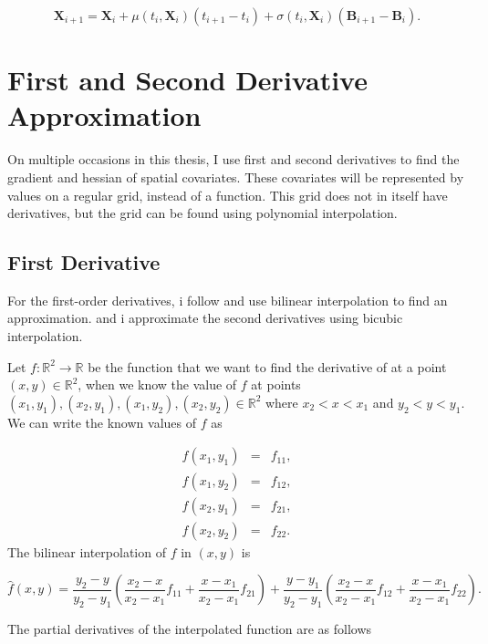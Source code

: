 \begin{equation}
    \textbf{X}_{i+1} = \textbf{X}_i + \mu(t_i, \textbf{X}_i)(t_{i+1} - t_i) + \sigma(t_i, \textbf{X}_i)(\textbf{B}_{i+1} - \textbf{B}_i).
    \label{eq: euler approximation}
\end{equation}

\parencite{iacus_simulation_2008}



\section{First and Second Derivative Approximation}
On multiple occasions in this thesis, I use first and second derivatives to find the gradient and hessian of spatial covariates. These covariates will be represented by values on a regular grid, instead of a function. This grid does not in itself have derivatives, but the grid can be found using polynomial interpolation.
\subsection{First Derivative}
\label{subsec: gradient estimation}
 For the first-order derivatives, i follow \parencite{michelot_langevin_2019} and use bilinear interpolation to find an approximation. and i approximate the second derivatives using bicubic interpolation. 



Let $f:\mathbb{R}^2\rightarrow \mathbb{R}$ be the function that we want to find the derivative of at a point $(x,y) \in \mathbb{R}^2$, when we know the value of $f$ at points $(x_1, y_1), (x_2, y_1), (x_1, y_2), (x_2, y_2) \in \mathbb{R}^2$ where $x_2 < x < x_1$ and $y_2 < y < y_1$. We can write the known values of $f$ as 


$$
\begin{array}{lcl}
     f(x_1, y_1)& = & f_{11},  \\
     f(x_1, y_2)& = & f_{12},  \\
     f(x_2, y_1)& = & f_{21},  \\
     f(x_2, y_2)& = & f_{22}.  
\end{array}
$$
The bilinear interpolation of $f$ in $(x,y)$ is  

$$
\hat{f}(x,y) = \frac{y_2-y}{y_2-y_1}(\frac{x_2-x}{x_2-x_1}f_{11} + \frac{x-x_1}{x_2-x_1}f_{21}) + \frac{y-y_1}{y_2-y_1}(\frac{x_2-x}{x_2-x_1}f_{12} + \frac{x-x_1}{x_2-x_1}f_{22}).
$$

The partial derivatives of the interpolated function are as follows

